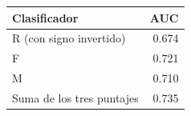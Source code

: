 \begin{tabular}{lr}
\toprule
Clasificador & AUC \\
\midrule
R (con signo invertido) & 0.674 \\
F & 0.721 \\
M & 0.710 \\
Suma de los tres puntajes & 0.735 \\
\bottomrule
\end{tabular}
